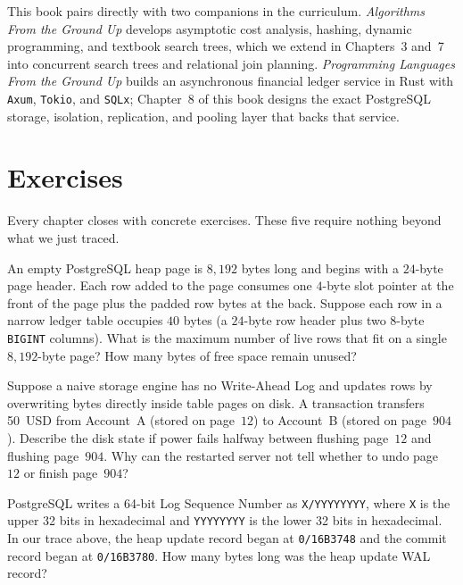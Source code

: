 \begin{connectionbox}
This book pairs directly with two companions in the curriculum. \emph{Algorithms From the Ground Up} develops asymptotic cost analysis, hashing, dynamic programming, and textbook search trees, which we extend in Chapters~3 and~7 into concurrent search trees and relational join planning. \emph{Programming Languages From the Ground Up} builds an asynchronous financial ledger service in Rust with \texttt{Axum}, \texttt{Tokio}, and \texttt{SQLx}; Chapter~8 of this book designs the exact PostgreSQL storage, isolation, replication, and pooling layer that backs that service.
\end{connectionbox}

\section*{Exercises}

Every chapter closes with concrete exercises. These five require nothing beyond what we just traced.

\begin{exercise}
An empty PostgreSQL heap page is $8{,}192$ bytes long and begins with a $24$-byte page header. Each row added to the page consumes one $4$-byte slot pointer at the front of the page plus the padded row bytes at the back. Suppose each row in a narrow ledger table occupies $40$ bytes (a $24$-byte row header plus two $8$-byte \texttt{BIGINT} columns). What is the maximum number of live rows that fit on a single $8{,}192$-byte page? How many bytes of free space remain unused?
\end{exercise}

\begin{exercise}
Suppose a naive storage engine has no Write-Ahead Log and updates rows by overwriting bytes directly inside table pages on disk. A transaction transfers 50~USD from Account~A (stored on page~$12$) to Account~B (stored on page~$904$). Describe the disk state if power fails halfway between flushing page~$12$ and flushing page~$904$. Why can the restarted server not tell whether to undo page~$12$ or finish page~$904$?
\end{exercise}

\begin{exercise}
PostgreSQL writes a 64-bit Log Sequence Number as \texttt{X/YYYYYYYY}, where \texttt{X} is the upper 32 bits in hexadecimal and \texttt{YYYYYYYY} is the lower 32 bits in hexadecimal. In our trace above, the heap update record began at \texttt{0/16B3748} and the commit record began at \texttt{0/16B3780}. How many bytes long was the heap update WAL record?
\end{exercise}


